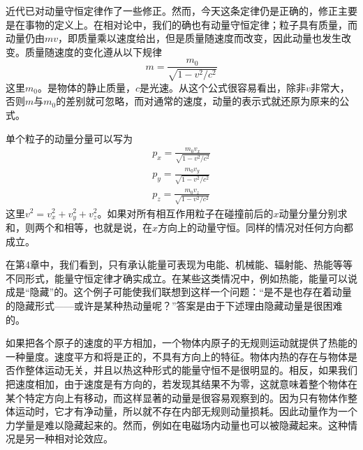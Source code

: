 近代已对动量守恒定律作了一些修正。然而，今天这条定律仍是正确的，修正主要是在事物的定义上。在相对论中，我们的确也有动量守恒定律；粒子具有质量，而动量仍由$mv$，即质量乘以速度给出，但是质量随速度而改变，因此动量也发生改变。质量随速度的变化遵从以下规律
\begin{equation}
    \label{Eq:I:10:7}
    m=\frac{m_0}{\sqrt{1-v^2/c^2}}
\end{equation}
这里$m_0$。是物体的静止质量，$c$是光速。从这个公式很容易看出，除非$v$非常大，否则$m$与$m_0$的差别就可忽略，而对通常的速度，动量的表示式就还原为原来的公式。

单个粒子的动量分量可以写为
\begin{equation}
    \label{Eq:I:10:8}
    \begin{split}
        p_x=\frac{m_0v_x}{\sqrt{1-v^2/c^2}} \\
        p_y=\frac{m_0v_y}{\sqrt{1-v^2/c^2}} \\
        p_z=\frac{m_0v_z}{\sqrt{1-v^2/c^2}}
    \end{split}
\end{equation}
这里$v^2=v^2_x+v^2_y+v^2_z$。如果对所有相互作用粒子在碰撞前后的$x$动量分量分别求和，则两个和相等，也就是说，在$x$方向上的动量守恒。同样的情况对任何方向都成立。

在第4章中，我们看到，只有承认能量可表现为电能、机械能、辐射能、热能等等不同形式，能量守恒定律才确实成立。在某些这类情况中，例如热能，能量可以说成是“隐藏”的。这个例子可能使我们联想到这样一个问题：“是不是也存在着动量的隐藏形式——或许是某种热动量呢？”答案是由于下述理由隐藏动量是很困难的。

如果把各个原子的速度的平方相加，一个物体内原子的无规则运动就提供了热能的一种量度。速度平方和将是正的，不具有方向上的特征。物体内热的存在与物体是否作整体运动无关，并且以热这种形式的能量守恒不是很明显的。相反，如果我们把速度相加，由于速度是有方向的，若发现其结果不为零，这就意味着整个物体在某个特定方向上有移动，而这样显著的动量是很容易观察到的。因为只有物体作整体运动时，它才有净动量，所以就不存在内部无规则动量损耗。因此动量作为一个力学量是难以隐藏起来的。然而，例如在电磁场内动量也可以被隐藏起来。这种情况是另一种相对论效应。

